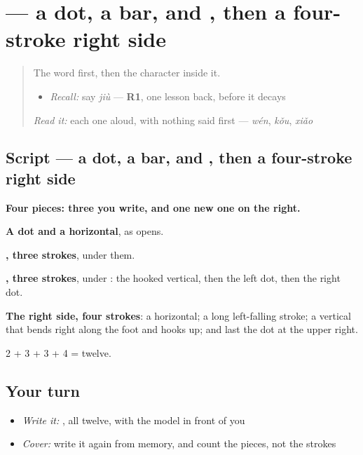 \section[\texorpdfstring{\zh{就} (jiù)}{就 (jiù)}]{ — a dot, a bar,  and , then a four-stroke right side}

\label{lesson:ZH-W288-jiu}



\begin{quote}
The word first, then the character inside it.

\begin{itemize}
\raggedright
  \item \emph{Recall:} say \emph{jiù} — \textbf{R1}, one lesson back, before it decays
\end{itemize}

\begin{quote}
  
\end{quote}

\emph{Read it:} each one aloud, with nothing said first — \emph{wén}, \emph{kǒu}, \emph{xiǎo}
\end{quote}

\subsection*{Script — a dot, a bar,  and , then a four-stroke right side}

\begin{quote}
\end{quote}

\textbf{Four pieces: three you write, and one new one on the right.}

\textbf{A dot and a horizontal}, as  opens.

\textbf{, three strokes}, under them.

\textbf{, three strokes}, under : the hooked vertical, then the left dot, then the right dot.

\textbf{The right side, four strokes}: a horizontal; a long left-falling stroke; a vertical that bends right along the foot and hooks up; and last the dot at the upper right.

2 + 3 + 3 + 4 = twelve.

\subsection*{Your turn}
\begin{itemize}
\raggedright
  \item \emph{Write it:} , all twelve, with the model in front of you
  \item \emph{Cover:} write it again from memory, and count the pieces, not the strokes
\end{itemize}

